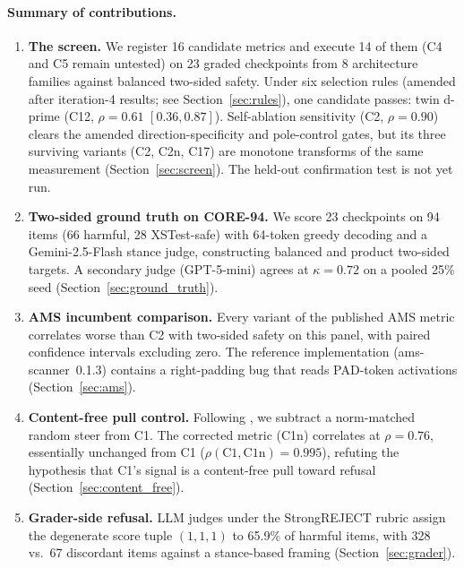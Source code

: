 \documentclass[11pt,letterpaper]{article}
\begin{document}
\paragraph{Summary of contributions.}
\begin{enumerate}
\item \textbf{The screen.} We register 16 candidate metrics and execute 14
  of them (C4 and C5 remain untested) on 23 graded checkpoints from 8
  architecture families against balanced two-sided safety. Under six
  selection rules (amended after iteration-4 results; see
  Section~\ref{sec:rules}), one candidate passes: twin d-prime
  (C12, $\rho = 0.61$ $[0.36, 0.87]$). Self-ablation sensitivity
  (C2, $\rho = 0.90$) clears the amended direction-specificity and
  pole-control gates, but its three surviving variants (C2, C2n, C17)
  are monotone transforms of the same measurement
  (Section~\ref{sec:screen}). The held-out confirmation test is not yet
  run.

\item \textbf{Two-sided ground truth on CORE-94.} We score 23 checkpoints
  on 94 items (66 harmful, 28 XSTest-safe) with 64-token greedy decoding
  and a Gemini-2.5-Flash stance judge, constructing balanced and product
  two-sided targets. A secondary judge (GPT-5-mini) agrees at
  $\kappa = 0.72$ on a pooled 25\% seed
  (Section~\ref{sec:ground_truth}).

\item \textbf{AMS incumbent comparison.} Every variant of the published AMS
  metric \citep{Messenger2026} correlates worse than C2 with two-sided
  safety on this panel, with paired confidence intervals excluding zero.
  The reference implementation (ams-scanner~0.1.3) contains a
  right-padding bug that reads PAD-token activations
  (Section~\ref{sec:ams}).

\item \textbf{Content-free pull control.} Following
  \citet{Malla2026}, we subtract a norm-matched random steer from C1.
  The corrected metric (C1n) correlates at $\rho = 0.76$, essentially
  unchanged from C1 ($\rho(\text{C1}, \text{C1n}) = 0.995$), refuting the
  hypothesis that C1's signal is a content-free pull toward refusal
  (Section~\ref{sec:content_free}).

\item \textbf{Grader-side refusal.} LLM judges under the StrongREJECT
  rubric \citep{Souly2024} assign the degenerate score tuple $(1,1,1)$ to
  65.9\% of harmful items, with 328 vs.\ 67 discordant items against a
  stance-based framing (Section~\ref{sec:grader}).
\end{enumerate}
\end{document}
